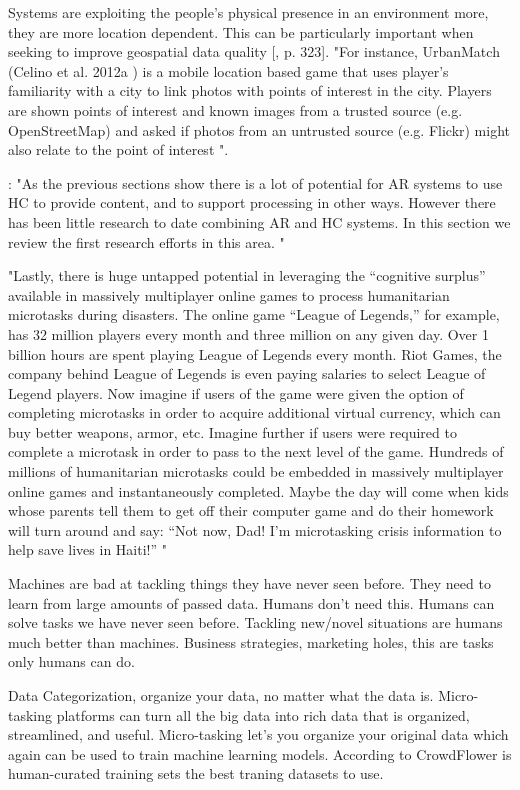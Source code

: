 Systems are exploiting the people's physical presence in an environment more, they are more location dependent. This can be particularly important when seeking to improve geospatial data quality [\citep{Meier2013}, p. 323]. "For instance, UrbanMatch (Celino et al. 2012a ) is a mobile location based game that uses player’s familiarity with a city to link photos with points of interest in the city. Players are shown points of interest and known images from a trusted source (e.g. OpenStreetMap) and asked if photos from an untrusted source (e.g. Flickr) might also relate to the point of interest ".  

\citep{Meier2013}:  "As the previous sections show there is a lot of potential for AR systems to use HC to provide content, and to support processing in other ways. However there has been
little research to date combining AR and HC systems. In this section we review the first research efforts in this area. " 

\citep{Meier2013} "Lastly, there is huge untapped potential in leveraging the “cognitive surplus” available in massively multiplayer online games to process humanitarian microtasks during disasters. The online game “League of Legends,” for example, has 32 million players every month and three million on any given day. Over 1 billion hours are spent playing League of Legends every month. Riot Games, the company behind League of Legends is even paying salaries to select League of Legend players. Now imagine if users of the game were given the option of completing microtasks in order to acquire additional virtual currency, which can buy better weapons, armor, etc. Imagine further if users were required to complete a microtask in order to pass to the next level of the game. Hundreds of millions of humanitarian microtasks could be embedded in massively multiplayer online games and instantaneously completed. Maybe the day will come when kids whose parents tell them to get off their computer game and do their homework will turn around and say: “Not now, Dad! I’m microtasking crisis information to help save lives in Haiti!” "

Machines are bad at tackling things they have never seen before. They need to learn from large amounts of passed data. Humans don't need this. Humans can solve tasks we have never seen before. Tackling new/novel situations are humans much better than machines. Business strategies, marketing holes, this are tasks only humans can do.   %

Data Categorization, organize your data, no matter what the data is. Micro-tasking platforms can turn all the big data into rich data that is organized, streamlined, and useful. Micro-tasking let's you organize your original data which again can be used to train machine learning models. According to CrowdFlower is human-curated training sets the best traning datasets to use. %